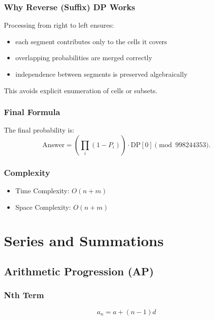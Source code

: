 \documentclass[11pt]{article}
\begin{document}
\subsubsection{Why Reverse (Suffix) DP Works}

Processing from right to left ensures:
\begin{itemize}
    \item each segment contributes only to the cells it covers
    \item overlapping probabilities are merged correctly
    \item independence between segments is preserved algebraically
\end{itemize}

This avoids explicit enumeration of cells or subsets.

\subsubsection{Final Formula}

The final probability is:
\[
\text{Answer} =
\left( \prod_i (1 - P_i) \right)
\cdot
\text{DP}[0]
\pmod{998244353}.
\]

\subsubsection{Complexity}

\begin{itemize}
    \item Time Complexity: $O(n + m)$
    \item Space Complexity: $O(n + m)$
\end{itemize}


\section{Series and Summations}

\subsection{Arithmetic Progression (AP)}

\subsubsection{Nth Term}
\[
a_n = a + (n-1)d
\]
\end{document}
